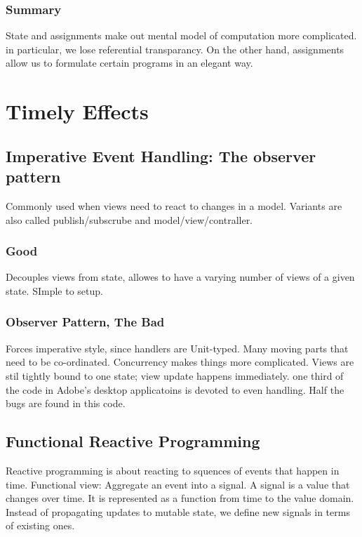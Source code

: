 \documentclass[10pt, a4paper]{report}
\begin{document}
\subsection{Summary}

State and assignments make out mental model of computation more complicated. in particular, we lose referential transparancy. On the other hand, assignments allow us to formulate certain programs in an elegant way.



\chapter{Timely Effects}
\section{Imperative Event Handling: The observer pattern}
Commonly used when views need to react to changes in a model. Variants are also called publish/subscrube and model/view/contraller.

\subsection{Good}

Decouples views from state, allowes to have a varying number of views of a given state. SImple to setup.

\subsection{Observer Pattern, The Bad}

Forces imperative style, since handlers are Unit-typed. Many moving parts that need to be co-ordinated. Concurrency makes things more complicated. Views are stil tightly bound to one state; view update happens immediately. one third of the code in Adobe's desktop applicatoins is devoted to even handling. Half the bugs are found in this code.

\section{Functional Reactive Programming}

Reactive programming is about reacting to squences of events that happen in time. Functional view: Aggregate an event into a signal. A signal is a value that changes over time. It is represented as a function from time to the value domain. Instead of propagating updates to mutable state, we define new signals in terms of existing ones. 
\end{document}
